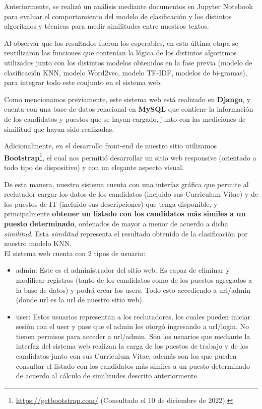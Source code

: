 \documentclass[12pt,a4paper]{article}
\begin{document}
\begin{sloppypar}
Anteriormente, se realizó un análisis mediante documentos en Jupyter Notebook para evaluar el comportamiento del modelo de clasificación y los distintos algoritmos y técnicas para medir similitudes entre nuestros textos.

Al observar que los resultados fueron los esperables, en esta última etapa se reutilizaron las funciones que contenían la lógica de los distintos algoritmos utilizados junto con los distintos modelos obtenidos en la fase previa (modelo de clasificación KNN, modelo Word2vec, modelo TF-IDF, modelos de bi-gramas), para integrar todo este conjunto en el sistema web.

Como mencionamos previamente, este sistema web está realizado en \textbf{Django}, y cuenta con una base de datos relacional en \textbf{MySQL} que contiene la información de los candidatos y puestos que se hayan cargado, junto con las mediciones de similitud que hayan sido realizadas.

Adicionalmente, en el desarrollo front-end de nuestro sitio utilizamos \textbf{Bootstrap}\footnote{\url{https://getbootstrap.com/} (Consultado el 10 de diciembre de 2022).}, el cual nos permitió desarrollar un sitio web responsive (orientado a todo tipo de dispositivo) y con un elegante aspecto visual.

De esta manera, nuestro sistema cuenta con una interfaz gráfica que permite al reclutador cargar los datos de los candidatos (incluido sus Curriculum Vitae) y de los puestos de IT (incluido sus descripciones) que tenga disponible, y principalmente \textbf{obtener un listado con los candidatos más similes a un puesto determinado}, ordenados de mayor a menor de acuerdo a dicha \textit{similitud}. Esta \textit{similitud} representa el resultado obtenido de la clasificación por nuestro modelo KNN.\\

El sistema web cuenta con 2 tipos de usuario: 
\begin{itemize}
\item admin: Este es el administrador del sitio web. Es capaz de eliminar y modificar registros (tanto de los candidatos como de los puestos agregados a la base de datos) y podrá crear los users. Todo esto accediendo a url/admin (donde url es la url de nuestro sitio web).
\item user: Estos usuarios representan a los reclutadores, los cuales pueden iniciar sesión con el user y pass que el admin les otorgó ingresando a url/login. No tienen permisos para acceder a url/admin. Son los usuarios que mediante la interfaz del sistema web realizan la carga de los puestos de trabajo y de los candidatos junto con sus Curriculum Vitae; además son los que pueden consultar el listado con los candidatos más similes a un puesto determinado de acuerdo al cálculo de similitudes descrito anteriormente.
\end{itemize}


\end{sloppypar}
\end{document}
